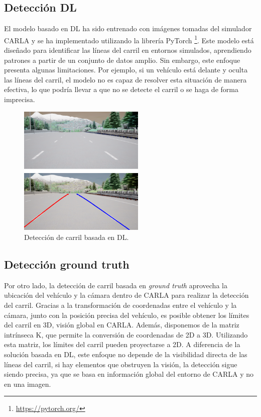\subsection{Detección \ac{DL}}
\label{sec:gt}

El modelo basado en \ac{DL} ha sido entrenado con imágenes tomadas del simulador CARLA y se ha implementado utilizando la librería PyTorch \footnote{\url{https://pytorch.org/}}. Este modelo está diseñado para identificar las líneas del carril en entornos simulados, aprendiendo patrones a partir de un conjunto de datos amplio. Sin embargo, este enfoque presenta algunas limitaciones. Por ejemplo, si un vehículo está delante y oculta las líneas del carril, el modelo no es capaz de resolver esta situación de manera efectiva, lo que podría llevar a que no se detecte el carril o se haga de forma imprecisa.

\begin{figure}[ht]
  \begin{center}
    \includegraphics[width=6cm]{figs/Plataformas_Desarollo/carla_lane_dl.png}
  \end{center}
  \caption{Detección de carril basada en \ac{DL}.}
  \label{dl_lane}
\end{figure}

\subsection{Detección ground truth}
\label{sec:gt}

Por otro lado, la detección de carril basada en \textit{ground truth} aprovecha la ubicación del vehículo y la cámara dentro de CARLA para realizar la detección del carril. Gracias a la transformación de coordenadas entre el vehículo y la cámara, junto con la posición precisa del vehículo, es posible obtener los límites del carril en 3D, visión global en CARLA. Además, disponemos de la matriz intrínseca K, que permite la conversión de coordenadas de 2D a 3D. Utilizando esta matriz, los límites del carril pueden proyectarse a 2D. A diferencia de la solución basada en \ac{DL}, este enfoque no depende de la visibilidad directa de las líneas del carril, si hay elementos que obstruyen la visión, la detección sigue siendo precisa, ya que se basa en información global del entorno de CARLA y no en una imagen.

